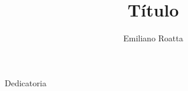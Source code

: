 \documentclass[a4paper,11pt,twoside,openright]{book}
\title{Título}
\author{Emiliano Roatta}
\begin{document}
\frontmatter

\maketitle

\begin{flushright}
\null{}
  Dedicatoria
\null
\end{flushright}



\tableofcontents
\listoffigures
\listoftables

\mainmatter


\backmatter
\end{document}
